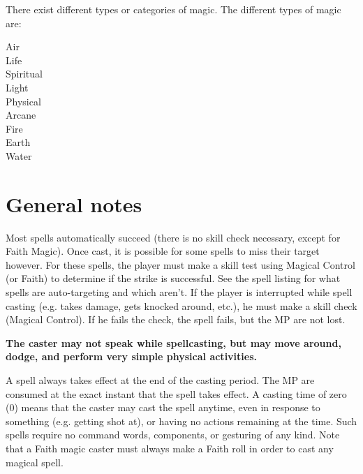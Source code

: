 \documentclass[twoside]{book}
\begin{document}
    There exist different types or categories of magic.
               The different types of magic are: 
\begin{description}
    
  \item[ Air ] 
  \item[ Life ] 
  \item[ Spiritual ] 
  \item[ Light ] 
  \item[ Physical ] 
  \item[ Arcane ] 
  \item[ Fire ] 
  \item[ Earth ] 
  \item[ Water ] 
\end{description}
  
    

\section{General notes}
      Most spells automatically succeed (there is no skill
             check necessary, except for Faith Magic). Once cast, it is
             possible for some spells to miss their target however. For
             these spells, the player must make a skill test using
             Magical Control (or Faith) to determine if the strike is
             successful. See the spell listing for what spells are
             auto-targeting and which aren't.   If the player is interrupted while spell casting (e.g.
            takes damage, gets knocked around, etc.), he must make a
            skill check (Magical Control). If he fails the check, the
            spell fails, but the MP are not lost.
              

 \textbf{ The caster may not speak while spellcasting, but may
               move around, dodge, and perform very simple physical
               activities. }


            A spell always takes effect at the end of the casting
             period. The MP are consumed at the exact instant that the
             spell takes effect.   A casting time of zero (0) means that the caster may
             cast the spell anytime, even in response to something (e.g.
             getting shot at), or having no actions remaining at the
             time. Such spells require no command words, components, or
             gesturing of any kind.   Note that a Faith magic caster must always make a
             Faith roll in order to cast any magical spell. 
    
\end{document}
